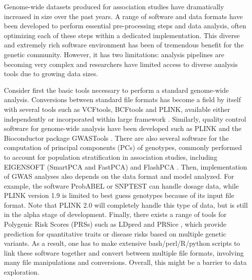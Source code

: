\documentclass{bioinfo}
\begin{document}
Genome-wide datasets produced for association studies have dramatically increased in size over the past years. A range of software and data formats have been developed to perform essential pre-processing steps and data analysis, often optimizing each of these steps within a dedicated implementation. This diverse and extremely rich software environment has been of tremendous benefit for the genetic community. However, it has two limitations: analysis pipelines are becoming very complex and researchers have limited access to diverse analysis tools due to growing data sizes.

Consider first the basic tools necessary to perform a standard genome-wide analysis. Conversions between standard file formats has become a field by itself with several tools such as VCFtools, BCFtools and PLINK, available either independently or incorporated within large framework \cite[]{Danecek2011,Li2011,Purcell2007}. Similarly, quality control software for genome-wide analysis have been developed such as PLINK and the Bioconductor package GWASTools \cite[]{Gogarten2012}.
There are also several software for the computation of principal components (PCs) of genotypes, commonly performed to account for population stratification in association studies, including EIGENSOFT (SmartPCA and FastPCA) and FlashPCA \cite[]{Abraham2014a,Abraham2016a,Galinsky2016,Price2006}.
Then, implementation of GWAS analyses also depends on the data format and model analyzed. For example, the software ProbABEL \cite[]{Aulchenko2010} or SNPTEST \cite[]{Marchini2010} can handle dosage data, 
{\color{red}
while PLINK version 1.9 is limited to best guess genotypes because of its input file format. Note that PLINK 2.0 will completely handle this type of data, but is still in the alpha stage of development. 
}
Finally, there exists a range of tools for Polygenic Risk Scores (PRSs) such as LDpred \cite[]{Vilhjalmsson2015} and PRSice \cite[]{Euesden2015}, which provide prediction for quantitative traits or disease risks based on multiple genetic variants. As a result, one has to make extensive bash/perl/R/python scripts to link these software together and convert between multiple file formats, involving many file manipulations and conversions. Overall, this might be a barrier to data exploration. 
\end{document}
